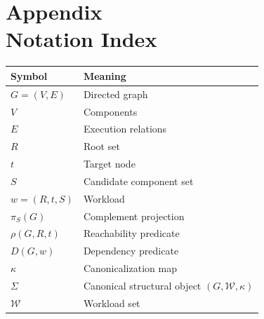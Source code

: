\documentclass[11pt]{article}
\begin{document}
\section*{Appendix \thesection\\Notation Index}
\label{app:notation}
\begin{center}
\begin{tabular}{@{}ll@{}}
\toprule
\textbf{Symbol} & \textbf{Meaning} \\
\midrule
$G=(V,E)$ & Directed graph \\
$V$ & Components \\
$E$ & Execution relations \\
$R$ & Root set \\
$t$ & Target node \\
$S$ & Candidate component set \\
$w=(R,t,S)$ & Workload \\
$\pi_S(G)$ & Complement projection \\
$\rho(G,R,t)$ & Reachability predicate \\
$D(G,w)$ & Dependency predicate \\
$\kappa$ & Canonicalization map \\
$\Sigma$ & Canonical structural object $(G,\mathcal{W},\kappa)$ \\
$\mathcal{W}$ & Workload set \\
\bottomrule
\end{tabular}
\end{center}



\end{document}
